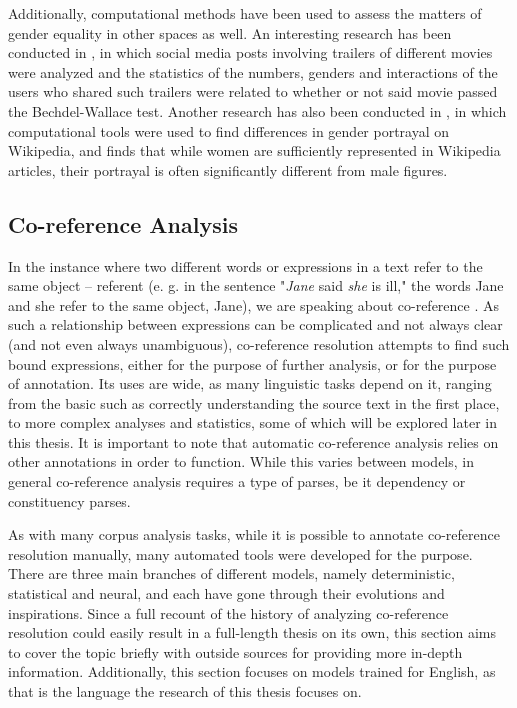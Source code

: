\documentclass[a4paper, 11pt]{article}
\begin{document}
Additionally, computational methods have been used to assess the matters of gender equality in other spaces as well. An interesting research has been conducted in \citet{bechdeltwitter}, in which social media posts involving trailers of different movies were analyzed and the statistics of the numbers, genders and interactions of the users who shared such trailers were related to whether or not said movie passed the Bechdel-Wallace test. Another research has also been conducted in \citet{bechdelwiki}, in which computational tools were used to find differences in gender portrayal on Wikipedia, and finds that while women are sufficiently represented in Wikipedia articles, their portrayal is often significantly different from male figures.

\subsection{Co-reference Analysis}
In the instance where two different words or expressions in a text refer to the same object -- referent (e. g. in the sentence "\textit{Jane} said \textit{she} is ill," the words Jane and she refer to the same object, Jane), we are speaking about co-reference \citep{dictionary}. As such a relationship between expressions can be complicated and not always clear (and not even always unambiguous), co-reference resolution attempts to find such bound expressions, either for the purpose of further analysis, or for the purpose of annotation. Its uses are wide, as many linguistic tasks depend on it, ranging from the basic such as correctly understanding the source text in the first place, to more complex analyses and statistics, some of which will be explored later in this thesis. It is important to note that automatic co-reference analysis relies on other annotations in order to function. While this varies between models, in general co-reference analysis requires a type of parses, be it dependency or constituency parses.

As with many corpus analysis tasks, while it is possible to annotate co-reference resolution manually, many automated tools were developed for the purpose. There are three main branches of different models, namely deterministic, statistical and neural, and each have gone through their evolutions and inspirations. Since a full recount of the history of analyzing co-reference resolution could easily result in a full-length thesis on its own, this section aims to cover the topic briefly with outside sources for providing more in-depth information. Additionally, this section focuses on models trained for English, as that is the language the research of this thesis focuses on.
\end{document}
